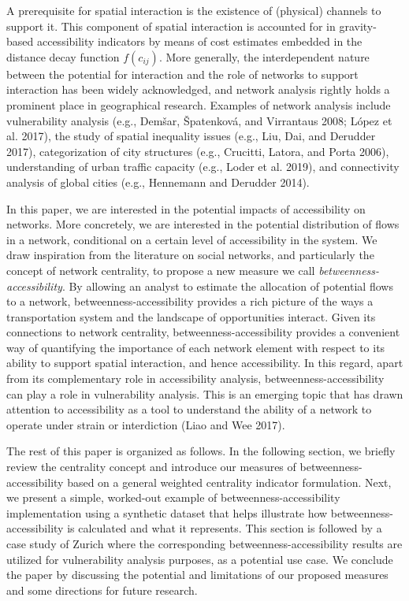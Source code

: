 \documentclass[]{elsarticle} %
\begin{document}
A prerequisite for spatial interaction is the existence of (physical)
channels to support it. This component of spatial interaction is
accounted for in gravity-based accessibility indicators by means of cost
estimates embedded in the distance decay function \(f(c_{ij})\). More
generally, the interdependent nature between the potential for
interaction and the role of networks to support interaction has been
widely acknowledged, and network analysis rightly holds a prominent
place in geographical research. Examples of network analysis include
vulnerability analysis (e.g., Demšar, Špatenková, and Virrantaus 2008;
López et al. 2017), the study of spatial inequality issues (e.g., Liu,
Dai, and Derudder 2017), categorization of city structures (e.g.,
Crucitti, Latora, and Porta 2006), understanding of urban traffic
capacity (e.g., Loder et al. 2019), and connectivity analysis of global
cities (e.g., Hennemann and Derudder 2014).

In this paper, we are interested in the potential impacts of
accessibility on networks. More concretely, we are interested in the
potential distribution of flows in a network, conditional on a certain
level of accessibility in the system. We draw inspiration from the
literature on social networks, and particularly the concept of network
centrality, to propose a new measure we call
\emph{betweenness-accessibility}. By allowing an analyst to estimate the
allocation of potential flows to a network, betweenness-accessibility
provides a rich picture of the ways a transportation system and the
landscape of opportunities interact. Given its connections to network
centrality, betweenness-accessibility provides a convenient way of
quantifying the importance of each network element with respect to its
ability to support spatial interaction, and hence accessibility. In this
regard, apart from its complementary role in accessibility analysis,
betweenness-accessibility can play a role in vulnerability analysis.
This is an emerging topic that has drawn attention to accessibility as a
tool to understand the ability of a network to operate under strain or
interdiction (Liao and Wee 2017).

The rest of this paper is organized as follows. In the following
section, we briefly review the centrality concept and introduce our
measures of betweenness-accessibility based on a general weighted
centrality indicator formulation. Next, we present a simple, worked-out
example of betweenness-accessibility implementation using a synthetic
dataset that helps illustrate how betweenness-accessibility is
calculated and what it represents. This section is followed by a case
study of Zurich where the corresponding betweenness-accessibility
results are utilized for vulnerability analysis purposes, as a potential
use case. We conclude the paper by discussing the potential and
limitations of our proposed measures and some directions for future
research.
\end{document}
